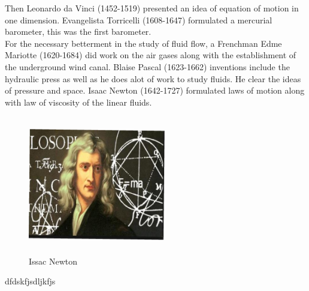  Then Leonardo da Vinci (1452-1519) presented an idea of equation of motion  in one dimension. Evangelista Torricelli (1608-1647) formulated a  mercurial barometer, this was the first barometer.\\
 \indent For the necessary betterment in the study of fluid flow, a Frenchman Edme Mariotte (1620-1684) did work  on the air gases along with the  establishment of the underground wind canal.
Blaise Pascal (1623-1662) inventions include the hydraulic press as well as he does alot of work to study fluids. He clear the ideas of pressure and space. Isaac Newton (1642-1727) formulated laws of motion along with law of viscosity of the linear fluids.
\begin{figure}\begin{center}
\includegraphics[width=6cm, height=6cm]{newton.eps}
\caption{Issac Newton }\label{fig:Isaac Newton}
\end{center}\end{figure}


dfdskfjsdljkfjs


